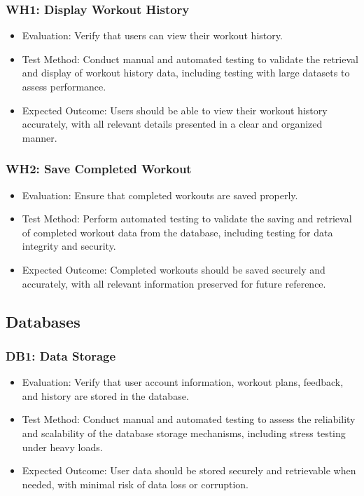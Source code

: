\documentclass[12pt, titlepage]{article}
\begin{document}
\subsubsection{WH1: Display Workout History}
\begin{itemize}
    \item Evaluation: Verify that users can view their workout history.
    \item Test Method: Conduct manual and automated testing to validate the retrieval and display of workout history data, including testing with large datasets to assess performance.
    \item Expected Outcome: Users should be able to view their workout history accurately, with all relevant details presented in a clear and organized manner.
\end{itemize}

\subsubsection{WH2: Save Completed Workout}
\begin{itemize}
    \item Evaluation: Ensure that completed workouts are saved properly.
    \item Test Method: Perform automated testing to validate the saving and retrieval of completed workout data from the database, including testing for data integrity and security.
    \item Expected Outcome: Completed workouts should be saved securely and accurately, with all relevant information preserved for future reference.
\end{itemize}

\subsection{Databases}

\subsubsection{DB1: Data Storage}
\begin{itemize}
    \item Evaluation: Verify that user account information, workout plans, feedback, and history are stored in the database.
    \item Test Method: Conduct manual and automated testing to assess the reliability and scalability of the database storage mechanisms, including stress testing under heavy loads.
    \item Expected Outcome: User data should be stored securely and retrievable when needed, with minimal risk of data loss or corruption.
\end{itemize}
\end{document}
